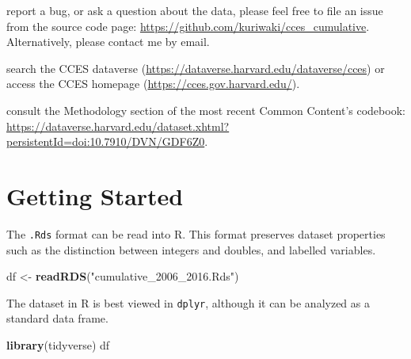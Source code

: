 \documentclass[10pt,article,oneside]{memoir}
\theoremstyle{definition}
\newenvironment{Shaded}{\begin{snugshade}}{\end{snugshade}}
\newcommand{\KeywordTok}[1]{\textcolor[rgb]{0.13,0.29,0.53}{\textbf{#1}}}
\newcommand{\StringTok}[1]{\textcolor[rgb]{0.31,0.60,0.02}{#1}}
\newcommand{\NormalTok}[1]{#1}
\begin{document}
\begin{tcolorbox}[boxrule=0pt,  fonttitle=\bfseries, subtitle style={boxrule=0.4pt, colback=black!75!white}]

report a bug, or ask a question about the data, please feel free to file an issue from the source code page:  \url{https://github.com/kuriwaki/cces_cumulative}. Alternatively, please contact me by email.

search the CCES dataverse (\url{https://dataverse.harvard.edu/dataverse/cces}) or access the CCES homepage (\url{https://cces.gov.harvard.edu/}).

consult the Methodology section of the most recent Common Content's codebook: \url{https://dataverse.harvard.edu/dataset.xhtml?persistentId=doi:10.7910/DVN/GDF6Z0}.

\end{tcolorbox}

\bigskip

\newpage

\section{Getting Started}\label{getting-started}

The \texttt{.Rds} format can be read into R. This format preserves
dataset properties such as the distinction between integers and doubles,
and labelled variables.

\begin{Shaded}
\begin{Highlighting}[]
\NormalTok{df <-}\StringTok{ }\KeywordTok{readRDS}\NormalTok{(}\StringTok{"cumulative_2006_2016.Rds"}\NormalTok{)}
\end{Highlighting}
\end{Shaded}

The dataset in R is best viewed in \texttt{dplyr}, although it can be
analyzed as a standard data frame.

\begin{Shaded}
\begin{Highlighting}[]
\KeywordTok{library}\NormalTok{(tidyverse)}
\NormalTok{df}
\end{Highlighting}
\end{Shaded}
\end{document}
